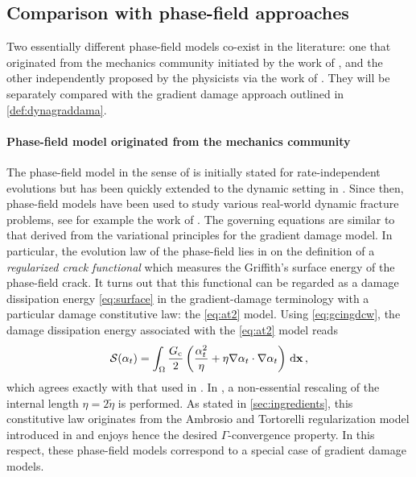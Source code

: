 \subsection{Comparison with phase-field approaches} \label{sec:phasefields}
Two essentially different phase-field models co-exist in the literature: one that originated from the mechanics community initiated by the work of \cite{MieheHofackerWelschinger:2010,MieheWelschingerHofacker:2010}, and the other independently proposed by the physicists via the work of \cite{KarmaKesslerLevine:2001,HakimKarma:2009}. They will be separately compared with the gradient damage approach outlined in \cref{def:dynagraddama}.

\paragraph{Phase-field model originated from the mechanics community}
The phase-field model in the sense of \cite{MieheHofackerWelschinger:2010,MieheWelschingerHofacker:2010} is initially stated for rate-independent evolutions but has been quickly extended to the dynamic setting in \cite{HofackerMiehe:2012,HofackerMiehe:2013}. Since then, phase-field models have been used to study various real-world dynamic fracture problems, see for example the work of \cite{BordenVerhooselScottHughesLandis:2012,SchlueterWillenbuecherKuhnMueller:2014}. The governing equations are similar to that derived from the variational principles for the gradient damage model. In particular, the evolution law of the phase-field  lies in on the definition of a \emph{regularized crack functional} which measures the Griffith's surface energy of the phase-field crack. It turns out that this functional can be regarded as a damage dissipation energy \eqref{eq:surface} in the gradient-damage terminology with a particular damage constitutive law: the \eqref{eq:at2} model. Using \eqref{eq:gcingdcw}, the damage dissipation energy associated with the \eqref{eq:at2} model reads
\[
\mathcal{S}(\alpha_t)=\int_\Omega\frac{\gc}{2}\left(\frac{\alpha_t^2}{\eta}+\eta\nabla\alpha_t\cdot\nabla\alpha_t\right)\dx\,,
\]
which agrees exactly with that used in \cite{MieheHofackerWelschinger:2010,MieheWelschingerHofacker:2010,HofackerMiehe:2012,HofackerMiehe:2013,KlinsmannRosatoKamlahMcMeeking:2015}. In \cite{BordenVerhooselScottHughesLandis:2012,SchlueterWillenbuecherKuhnMueller:2014,MayVignolletBorst:2015}, a non-essential rescaling of the internal length $\eta=2\widetilde{\eta}$ is performed. As stated in \cref{sec:ingredients}, this constitutive law originates from the Ambrosio and Tortorelli regularization model introduced in \cite{BourdinFrancfortMarigo:2000} and enjoys hence the desired $\Gamma$-convergence property. In this respect, these phase-field models correspond to a special case of gradient damage models.


